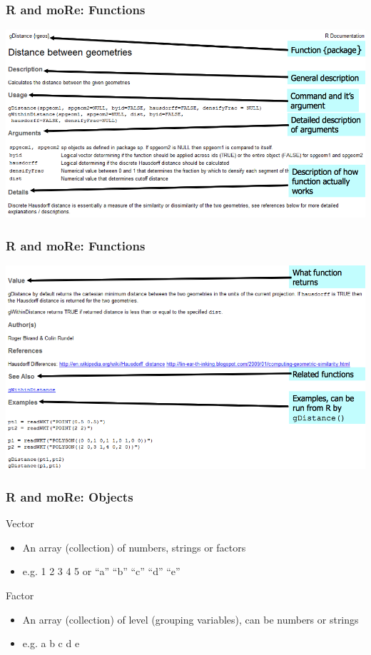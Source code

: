 \documentclass{beamer}
\begin{document}
\begin{frame}
\frametitle{R and moRe: Functions}
\centering
\includegraphics[width=\textwidth]{Figures/Rbasic1.png}
\end{frame}


\begin{frame}
\frametitle{R and moRe: Functions}
\centering
\includegraphics[width=\textwidth]{Figures/Rbasic2.png}
\end{frame}


\begin{frame}
\frametitle{R and moRe: Objects}
\begin{block}{Vector}
\begin{itemize}
\item An array (collection) of numbers, strings or factors
\item e.g. \alert{1 2 3 4 5} or \alert{``a'' ``b'' ``c'' ``d'' ``e''}
\end{itemize}
\end{block}
\vspace{1 cm}
\pause
\begin{block}{Factor}
\begin{itemize}
\item An array (collection) of level (grouping variables), can be numbers or strings
\item e.g. \alert{a b c d e}
\end{itemize}
\end{block}
\end{frame}
\end{document}
